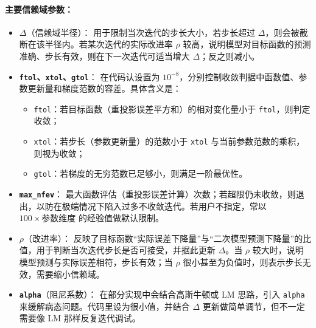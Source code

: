 \paragraph{主要信赖域参数：}
\begin{itemize}
	\item \textbf{$\Delta$}（信赖域半径）：
	用于限制当次迭代的步长大小，若步长超过 $\Delta$，则会被截断在该半径内。若某次迭代的实际改进率 $\rho$ 较高，说明模型对目标函数的预测准确、步长有效，则在下一次迭代可适当增大 $\Delta$；反之则减小。
	
	\item \textbf{\texttt{ftol}、\texttt{xtol}、\texttt{gtol}}：
	在代码认设置为 $10^{-8}$，分别控制收敛判据中函数值、参数更新量和梯度范数的容差。具体含义是：
	\begin{itemize}
		\item \texttt{ftol}：若目标函数（重投影误差平方和）的相对变化量小于 \texttt{ftol}，则判定收敛；
		\item \texttt{xtol}：若步长（参数更新量）的范数小于 \texttt{xtol} 与当前参数范数的乘积，则视为收敛；
		\item \texttt{gtol}：若梯度的无穷范数已足够小，则满足一阶最优性。
	\end{itemize}
	
	\item \textbf{\texttt{max\_nfev}}：
	最大函数评估（重投影误差计算）次数；若超限仍未收敛，则退出，以防在极端情况下陷入过多不收敛迭代。若用户不指定，常以 $100\times\text{参数维度}$ 的经验值做默认限制。
	
	\item \textbf{$\rho$}（改进率）：
	反映了目标函数“实际误差下降量”与“二次模型预测下降量”的比值，用于判断当次迭代步长是否可接受，并据此更新 $\Delta$。当 $\rho$ 较大时，说明模型预测与实际误差相符，步长有效；当 $\rho$ 很小甚至为负值时，则表示步长无效，需要缩小信赖域。
	
	\item \textbf{\texttt{alpha}}（阻尼系数）：
	在部分实现中会结合高斯牛顿或 LM 思路，引入 \texttt{alpha} 来缓解病态问题。代码里设为很小值，并结合 $\Delta$ 更新做简单调节，但不一定需要像 LM 那样反复迭代调试。
\end{itemize}

